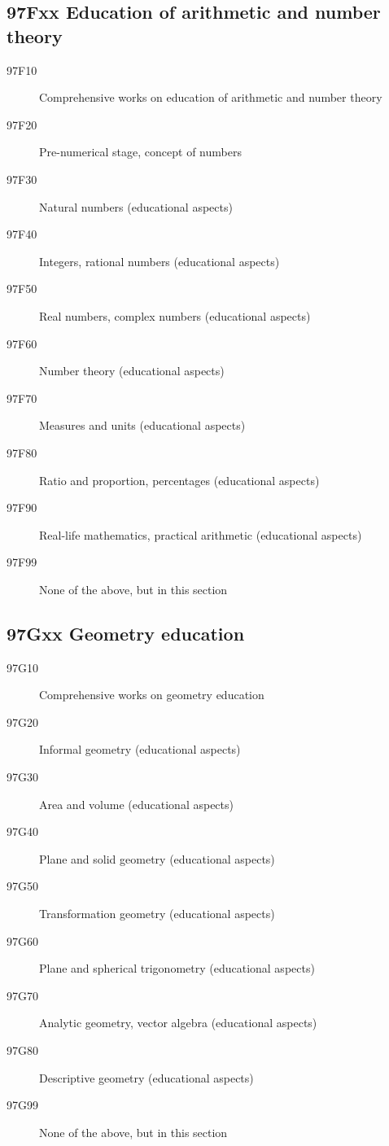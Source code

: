 \subsection*{97Fxx  Education of arithmetic and number theory }\label{97Fxx}
\begin{description}  
\item [97F10]\label{97F10} Comprehensive works on education of arithmetic and number theory
\item [97F20]\label{97F20} Pre-numerical stage, concept of numbers
\item [97F30]\label{97F30} Natural numbers (educational aspects)
\item [97F40]\label{97F40} Integers, rational numbers (educational aspects)
\item [97F50]\label{97F50} Real numbers, complex numbers (educational aspects)
\item [97F60]\label{97F60} Number theory (educational aspects)
\item [97F70]\label{97F70} Measures and units (educational aspects)
\item [97F80]\label{97F80} Ratio and proportion, percentages (educational aspects)
\item [97F90]\label{97F90} Real-life mathematics, practical arithmetic (educational aspects)
\item [97F99]\label{97F99} None of the above, but in this section
\end{description}
\subsection*{97Gxx  Geometry education}\label{97Gxx}
\begin{description}  
\item [97G10]\label{97G10} Comprehensive works on geometry education
\item [97G20]\label{97G20} Informal geometry (educational aspects)
\item [97G30]\label{97G30} Area and volume (educational aspects)
\item [97G40]\label{97G40} Plane and solid geometry (educational aspects)
\item [97G50]\label{97G50} Transformation geometry (educational aspects)
\item [97G60]\label{97G60} Plane and spherical trigonometry (educational aspects)
\item [97G70]\label{97G70} Analytic geometry, vector algebra (educational aspects)
\item [97G80]\label{97G80} Descriptive geometry (educational aspects)
\item [97G99]\label{97G99} None of the above, but in this section
\end{description}
